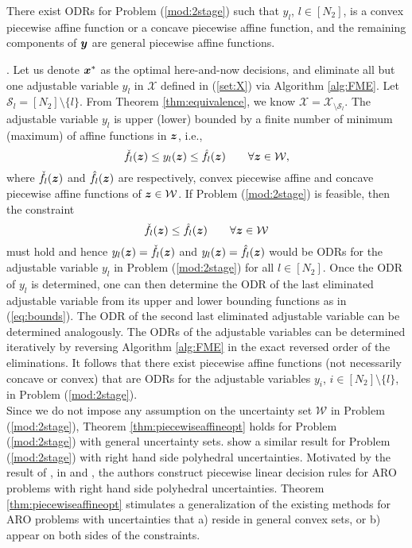 \documentclass[fleqn,orsc,blindrev]{informs4}
\newcommand{\mb}[1]{\mbox{\boldmath \ensuremath{#1}}}
\begin{document}
\begin{theorem} \label{thm:piecewiseaffineopt}
There exist ODRs for Problem (\ref{mod:2stage}) such that $y_l$, $l\in [N_2]$, is a convex piecewise affine function or a concave piecewise affine function, and the remaining components of $\mb{y}$ are general piecewise affine functions.
\end{theorem}
. Let us denote $\mb{x}^*$ as the optimal here-and-now decisions, and eliminate all but one adjustable variable $y_{l}$ in $\mathcal{X}$ defined in (\ref{set:X}) via Algorithm \ref{alg:FME}.  Let $\mathcal{S}_l=[N_2]\setminus \{l\}$. From Theorem \ref{thm:equivalence}, we know $\mathcal{X}=\mathcal{X}_{\setminus\mathcal{S}_l}$. The adjustable variable  $y_{l}$ is upper (lower) bounded by a finite number of minimum (maximum) of affine functions in $\mb{z}$, i.e.,
\begin{equation}
\label{eq:bounds}
\check{f}_l(\mb{z}) \leq y_{l}(\mb{z}) \leq \hat{f}_l(\mb{z}) \qquad \forall \mb{z} \in \mathcal{W},
\end{equation}
where $\check{f}_l(\mb{z})$ and $\hat{f}_l(\mb{z})$ are respectively, convex piecewise affine and concave piecewise affine functions of $\mb{z} \in \mathcal{W}$. If Problem (\ref{mod:2stage}) is feasible, then the constraint
\begin{equation*}
\check{f}_l(\mb{z}) \leq \hat{f}_l(\mb{z}) \qquad \forall \mb{z} \in \mathcal{W}
\end{equation*}
must hold and hence $y_{l}(\mb{z}) = \check{f}_l(\mb{z})$ and $y_{l}(\mb{z}) = \hat{f}_l(\mb{z})$ would be ODRs for the adjustable variable $y_l$ in Problem (\ref{mod:2stage}) for all $l \in [N_2]$. Once the ODR of $y_l$ is determined, one can then determine the ODR of the last eliminated adjustable variable from its upper and lower bounding functions as in (\ref{eq:bounds}).  {The ODR of the second last eliminated adjustable variable can be determined analogously. The ODRs of the adjustable variables can be determined iteratively by reversing Algorithm \ref{alg:FME} in the exact reversed order of the eliminations.} It follows that there exist piecewise affine functions (not necessarily concave or convex) that are ODRs for the adjustable variables $y_i$, $i\in [N_2]\setminus \{l\}$, in Problem (\ref{mod:2stage}). \hfill \Halmos  \\

Since we do not impose any assumption on the uncertainty set $\mathcal{W}$ in Problem (\ref{mod:2stage}), Theorem \ref{thm:piecewiseaffineopt} holds for Problem (\ref{mod:2stage}) with general uncertainty sets.  {\cite{bbm03} show a similar result for Problem (\ref{mod:2stage}) with right hand side polyhedral uncertainties. Motivated by the result of \cite{bbm03}, in \cite{bg15} and \cite{beg16}, the authors construct piecewise linear decision rules for ARO problems with right hand side polyhedral uncertainties. Theorem \ref{thm:piecewiseaffineopt} stimulates a generalization of the existing methods for ARO problems with uncertainties that a) reside in general convex sets, or b) appear on both sides of the constraints. }
\end{document}
